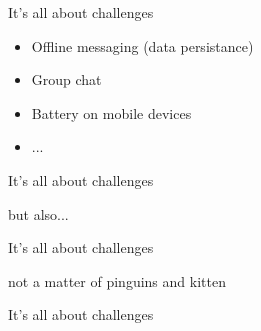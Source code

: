 \documentclass[pdf]{beamer}
\begin{document}

\begin{frame}{It's all about challenges}

\begin{itemize}
\item Offline messaging (data persistance)
\item Group chat
\item Battery on mobile devices
\item ...
\end{itemize}

\end{frame}


\begin{frame}{It's all about challenges}

but also...


\end{frame}


\begin{frame}{It's all about challenges}

not a matter of pinguins and kitten

\end{frame}


\begin{frame}{It's all about challenges}

\begin{itemize}
\end{itemize}

\end{frame}

\end{document}
